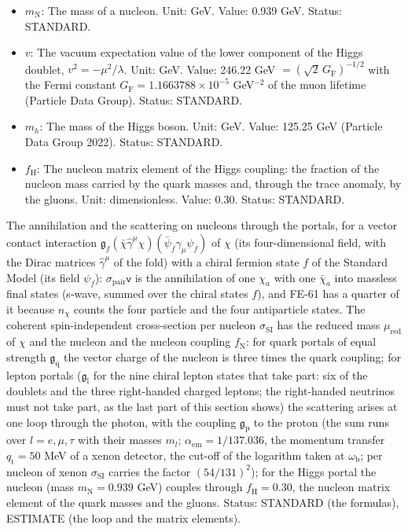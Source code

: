 \documentclass[
  10pt,
]{article}
\begin{document}
\begin{itemize}
  Status: STANDARD.
\item
  \(m_{\mathrm{N}}\): The mass of a nucleon. Unit: GeV. Value: 0.939
  GeV. Status: STANDARD.
\item
  \(v\): The vacuum expectation value of the lower component of the
  Higgs doublet, \(v^2 = -\mu^2/\lambda\). Unit: GeV. Value: 246.22 GeV
  \(= (\sqrt2\,G_{\mathrm{F}})^{-1/2}\) with the Fermi constant
  \(G_{\mathrm{F}} = 1.1663788\times10^{-5}\) GeV\(^{-2}\) of the muon
  lifetime (Particle Data Group). Status: STANDARD.
\item
  \(m_h\): The mass of the Higgs boson. Unit: GeV. Value: 125.25 GeV
  (Particle Data Group 2022). Status: STANDARD.
\item
  \(f_{\mathrm{H}}\): The nucleon matrix element of the Higgs coupling:
  the fraction of the nucleon mass carried by the quark masses and,
  through the trace anomaly, by the gluons. Unit: dimensionless. Value:
  0.30. Status: STANDARD.
\end{itemize}

The annihilation and the scattering on nucleons through the portals, for
a vector contact interaction
\(\mathfrak{g}_f(\bar\chi\hat\gamma^\mu\chi)(\bar\psi_f\hat\gamma_\mu\psi_f)\)
of \(\chi\) (its four-dimensional field, with the Dirac matrices
\(\hat\gamma^\mu\) of the fold) with a chiral fermion state \(f\) of the
Standard Model (its field \(\psi_f\)):
\(\sigma_{\mathrm{pair}}\mathsf{v}\) is the annihilation of one
\(\chi_a\) with one \(\bar\chi_a\) into massless final states (s-wave,
summed over the chiral states \(f\)), and FE-61 has a quarter of it
because \(n_\chi\) counts the four particle and the four antiparticle
states. The coherent spin-independent cross-section per nucleon
\(\sigma_{\mathrm{SI}}\) has the reduced mass \(\mu_{\mathrm{red}}\) of
\(\chi\) and the nucleon and the nucleon coupling \(f_{\mathrm{N}}\):
for quark portals of equal strength \(\mathfrak{g}_{\mathrm{q}}\) the
vector charge of the nucleon is three times the quark coupling; for
lepton portals (\(\mathfrak{g}_{\mathrm{l}}\) for the nine chiral lepton
states that take part: six of the doublets and the three right-handed
charged leptons; the right-handed neutrinos must not take part, as the
last part of this section shows) the scattering arises at one loop
through the photon, with the coupling \(\mathfrak{g}_{\mathrm{p}}\) to
the proton (the sum runs over \(l = e, \mu, \tau\) with their masses
\(m_l\); \(\alpha_{\mathrm{em}} = 1/137.036\), the momentum transfer
\(q_{\mathrm{t}} = 50\) MeV of a xenon detector, the cut-off of the
logarithm taken at \(\omega_{\mathrm{b}}\); per nucleon of xenon
\(\sigma_{\mathrm{SI}}\) carries the factor \((54/131)^2\)); for the
Higgs portal the nucleon (mass \(m_{\mathrm{N}} = 0.939\) GeV) couples
through \(f_{\mathrm{H}} = 0.30\), the nucleon matrix element of the
quark masses and the gluons. Status: STANDARD (the formulas), ESTIMATE
(the loop and the matrix elements).
\end{document}
